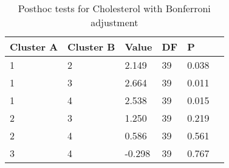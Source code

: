 \begin{table}[h]
\caption{Posthoc tests for Cholesterol with Bonferroni adjustment}
\label{tab:posthoc_Cholesterol}
\begin{tabular}{llllll}
\toprule
Cluster A & Cluster B & Value & DF & P &   \\
\midrule
1 & 2 & 2.149 & 39 & 0.038 &   \\
1 & 3 & 2.664 & 39 & 0.011 &   \\
1 & 4 & 2.538 & 39 & 0.015 &   \\
2 & 3 & 1.250 & 39 & 0.219 &   \\
2 & 4 & 0.586 & 39 & 0.561 &   \\
3 & 4 & -0.298 & 39 & 0.767 &   \\
\bottomrule
\end{tabular}
\end{table}

